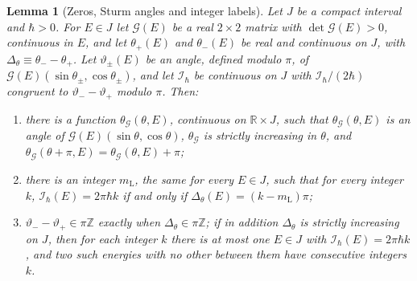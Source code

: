 \documentclass[aps,prd,onecolumn,tightenlines,nofootinbib,notitlepage,11pt,floatfix]{revtex4-2}
\theoremstyle{indentedtheorem}
\newtheorem{lemma}{Lemma}
\begin{document}
\begin{lemma}[Zeros, Sturm angles and integer labels]\label{lem:labels}
Let $J$ be a compact interval and $\hbar>0$. For $E\in J$ let $\mathcal{G}(E)$ be a real $2\times2$ matrix with $\det\mathcal{G}(E)>0$, continuous in $E$, and let $\theta_+(E)$ and $\theta_-(E)$ be real and continuous on $J$, with $\Delta_\theta\equiv\theta_--\theta_+$. Let $\vartheta_\pm(E)$ be an angle, defined modulo $\pi$, of $\mathcal{G}(E)(\sin\theta_\pm,\cos\theta_\pm)$, and let $\mathcal{I}_\hbar$ be continuous on $J$ with $\mathcal{I}_\hbar/(2\hbar)$ congruent to $\vartheta_--\vartheta_+$ modulo $\pi$. Then:
\begin{enumerate}
\item[(a)] there is a function $\theta_\mathcal{G}(\theta,E)$, continuous on $\mathbb{R}\times J$, such that $\theta_\mathcal{G}(\theta,E)$ is an angle of $\mathcal{G}(E)(\sin\theta,\cos\theta)$, $\theta_\mathcal{G}$ is strictly increasing in $\theta$, and $\theta_\mathcal{G}(\theta+\pi,E)=\theta_\mathcal{G}(\theta,E)+\pi$;
\item[(b)] there is an integer $m_\text{L}$, the same for every $E\in J$, such that for every integer $k$, $\mathcal{I}_\hbar(E)=2\pi\hbar k$ if and only if $\Delta_\theta(E)=(k-m_\text{L})\pi$;
\item[(c)] $\vartheta_--\vartheta_+\in\pi\mathbb{Z}$ exactly when $\Delta_\theta\in\pi\mathbb{Z}$; if in addition $\Delta_\theta$ is strictly increasing on $J$, then for each integer $k$ there is at most one $E\in J$ with $\mathcal{I}_\hbar(E)=2\pi\hbar k$, and two such energies with no other between them have consecutive integers $k$.
\end{enumerate}
\end{lemma}
\end{document}
